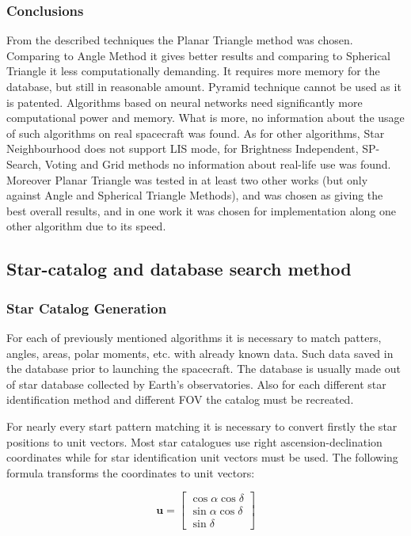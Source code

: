 \documentclass[12pt,a4paper,twoside]{article}
\begin{document}
\subsubsection{Conclusions}

From the described techniques the Planar Triangle method was chosen. Comparing to Angle Method it gives better results and comparing to Spherical Triangle it less computationally demanding\cite{tappe2009development}\cite{alidoost2013review}. It requires more memory for the database, but still in reasonable amount. Pyramid technique cannot be used as it is patented.
Algorithms based on neural networks need significantly more computational power and memory. What is more, no information about the usage of such algorithms on real spacecraft was found.
As for other algorithms, Star Neighbourhood does not support LIS mode, for Brightness Independent, SP-Search, Voting and Grid methods no information about real-life use was found. Moreover Planar Triangle was tested in at least two other works (but only against Angle and Spherical Triangle Methods), and was chosen as giving the best overall results, and in one work it was chosen for implementation along one other algorithm\cite{huffman2006designing} due to its speed.

\subsection{Star-catalog and database search method}

\subsubsection{Star Catalog Generation}

For each of previously mentioned algorithms it is necessary to match patters, angles, areas, polar moments, etc. with already known data. Such data saved in the database prior to launching the spacecraft. The database is usually made out of star database collected by Earth's observatories. Also for each different star identification method and different FOV the catalog must be recreated.
 
For nearly every start pattern matching it is necessary to convert firstly the star positions to unit vectors. Most star catalogues use right ascension-declination coordinates while for star identification unit vectors must be used\cite{mcbryde2012star}. The following formula transforms the coordinates to unit vectors:

\begin{equation}
\bm{u} = \begin{bmatrix}
\cos \alpha \cos \delta \\
\sin \alpha \cos \delta \\
\sin \delta
\end{bmatrix}
\end{equation}
\end{document}
